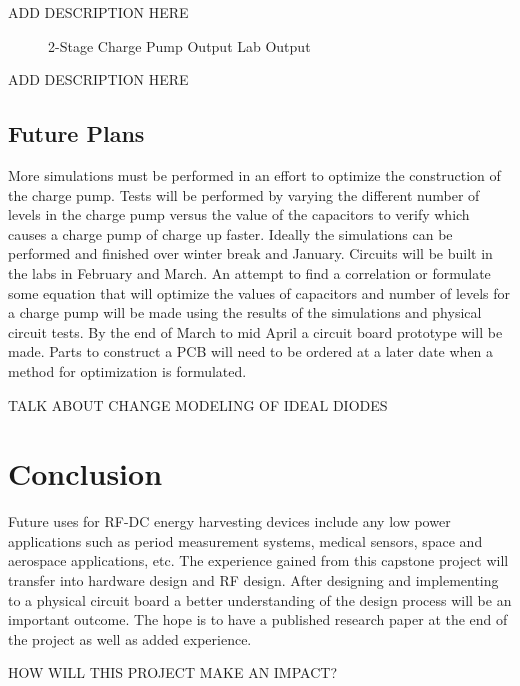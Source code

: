 \documentclass[12pt]{article}
\begin{document}
ADD DESCRIPTION HERE

\begin{figure}[H]
\caption{2-Stage Charge Pump Output Lab Output}
\label{fig:2SCP SR Out}
\end{figure}

ADD DESCRIPTION HERE

	\subsection{Future Plans}
More simulations must be performed in an effort to optimize the construction of the charge pump. Tests will be performed by varying the different number of levels in the charge pump versus the value of the capacitors to verify which causes a charge pump of charge up faster. Ideally the simulations can be performed and finished over winter break and January. Circuits will be built in the labs in February and March. An attempt to find a correlation or formulate some equation that will optimize the values of capacitors and number of levels for a charge pump will be made using the results of the simulations and physical circuit tests. By the end of March to mid April a circuit board prototype will be made. Parts to construct a PCB will need to be ordered at a later date when a method for optimization is formulated.
	
	TALK ABOUT CHANGE MODELING OF IDEAL DIODES 
	
	\section{Conclusion}
Future uses for RF-DC energy harvesting devices include any low power applications such as period measurement systems, medical sensors, space and aerospace applications, etc. The experience gained from this capstone project will transfer into hardware design and RF design. After designing and implementing to a physical circuit board a better understanding of the design process will be an important outcome. The hope is to have a published research paper at the end of the project as well as added experience.
	
	HOW WILL THIS PROJECT MAKE AN IMPACT?
	
	
	\newpage
	\label{bibliography}
	\nocite{*}
	\printbibliography
	
\end{document}
